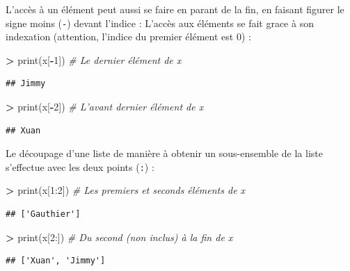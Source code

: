 \documentclass[12pt,]{book}
\newenvironment{Shaded}{\begin{snugshade}}{\end{snugshade}}
\newcommand{\DecValTok}[1]{\textcolor[rgb]{0.00,0.00,0.81}{#1}}
\newcommand{\CommentTok}[1]{\textcolor[rgb]{0.56,0.35,0.01}{\textit{#1}}}
\newcommand{\OperatorTok}[1]{\textcolor[rgb]{0.81,0.36,0.00}{\textbf{#1}}}
\newcommand{\BuiltInTok}[1]{#1}
\newcommand{\NormalTok}[1]{#1}
\numberwithin{equation}{section}
\numberwithin{countremarque}{section}
\begin{document}
L'accès à un élément peut aussi se faire en parant de la fin, en faisant
figurer le signe moins (\texttt{-}) devant l'indice : L'accès aux
éléments se fait grace à son indexation (attention, l'indice du premier
élément est 0) :

\begin{Shaded}
\begin{Highlighting}[]
\OperatorTok{>} \BuiltInTok{print}\NormalTok{(x[}\OperatorTok{-}\DecValTok{1}\NormalTok{]) }\CommentTok{# Le dernier élément de x}
\end{Highlighting}
\end{Shaded}

\begin{lstlisting}
## Jimmy
\end{lstlisting}

\begin{Shaded}
\begin{Highlighting}[]
\OperatorTok{>} \BuiltInTok{print}\NormalTok{(x[}\OperatorTok{-}\DecValTok{2}\NormalTok{]) }\CommentTok{# L'avant dernier élément de x}
\end{Highlighting}
\end{Shaded}

\begin{lstlisting}
## Xuan
\end{lstlisting}

Le découpage d'une liste de manière à obtenir un sous-ensemble de la
liste s'effectue avec les deux points (\texttt{:}) :

\begin{Shaded}
\begin{Highlighting}[]
\OperatorTok{>} \BuiltInTok{print}\NormalTok{(x[}\DecValTok{1}\NormalTok{:}\DecValTok{2}\NormalTok{]) }\CommentTok{# Les premiers et seconds éléments de x}
\end{Highlighting}
\end{Shaded}

\begin{lstlisting}
## ['Gauthier']
\end{lstlisting}

\begin{Shaded}
\begin{Highlighting}[]
\OperatorTok{>} \BuiltInTok{print}\NormalTok{(x[}\DecValTok{2}\NormalTok{:]) }\CommentTok{# Du second (non inclus) à la fin de x}
\end{Highlighting}
\end{Shaded}

\begin{lstlisting}
## ['Xuan', 'Jimmy']
\end{lstlisting}
\end{document}
